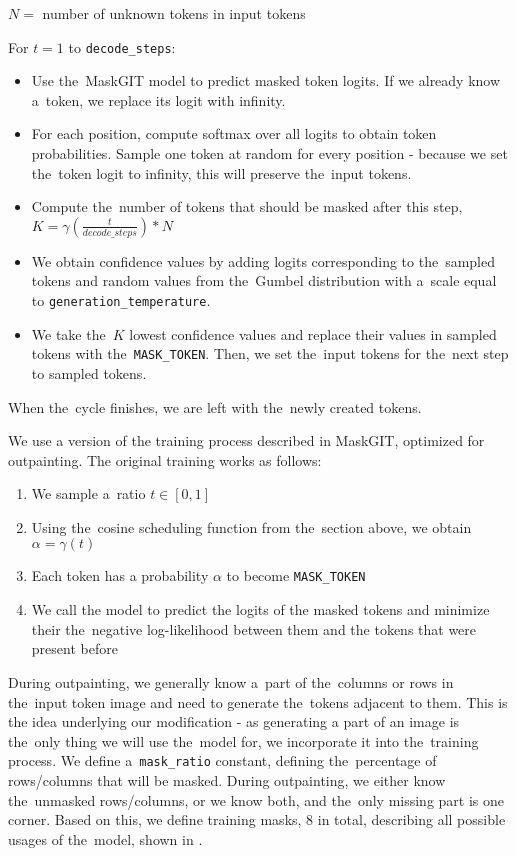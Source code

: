 $N =$ number of unknown tokens in input tokens

For $t = 1$ to \texttt{decode\_steps}:
\begin{itemize}
\item Use the~MaskGIT model to predict masked token logits. If we already know a~token, we replace its logit with infinity.
\item For each position, compute softmax over all logits to obtain token probabilities. Sample one token at random for every position - because we set the~token logit to infinity, this will preserve the~input tokens.
\item Compute the~number of tokens that should be masked after this step, $K=\gamma(\frac{t}{decode\_steps}) * N$
\item We obtain confidence values by adding logits corresponding to the~sampled tokens and random values from the~Gumbel distribution with a~scale equal to \texttt{generation\_temperature}.
\item We take the~$K$ lowest confidence values and replace their values in sampled tokens with the~\texttt{MASK\_TOKEN}. Then, we set the~input tokens for the~next step to sampled tokens.
\end{itemize}

When the~cycle finishes, we are left with the~newly created tokens.

We use a version of the training process described in MaskGIT, optimized for outpainting. The original training works as follows:
\begin{enumerate}
    \item We sample a~ratio $t \in [0, 1]$
    \item Using the~cosine scheduling function from the~section above, we obtain $\alpha = \gamma(t)$
    \item Each token has a probability $\alpha$ to become \texttt{MASK\_TOKEN}
    \item We call the model to predict the logits of the masked tokens and minimize their the~negative log-likelihood between them and the tokens that were present before
\end{enumerate}

During outpainting, we generally know a~part of the~columns or rows in the~input token image and need to generate the~tokens adjacent to them. This is the idea underlying our modification - as generating a part of an image is the~only thing we will use the~model for, we incorporate it into the~training process. We define a~\texttt{mask\_ratio} constant, defining the~percentage of rows/columns that will be masked. During outpainting, we either know the~unmasked rows/columns, or we know both, and the~only missing part is one corner. Based on this, we define training masks, 8 in total, describing all possible usages of the~model, shown in .

